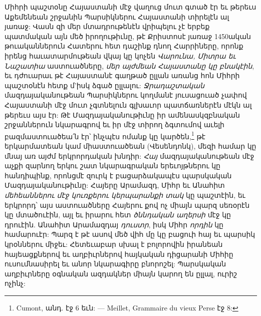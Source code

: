 \documentclass{article}
\begin{document}
{Միհրի պաշտօնը Հայաստանի մէջ վաղուց մուտ գտած էր եւ թերեւս Աքեմենեան շրջանին Պարսիկներու Հայաստանի տիրելէն ալ յառաջ: Վասն զի մեր մտադրութենէն վրիպելու չէ երբեք պատմական այն մեծ իրողութիւնը, թէ Քրիստոսէ յառաջ 1450ական թուականներուն Հատերու հետ դաշինք դնող Հարրիները, որոնք իրենց հաւատարմութեան վկայ կը կոչեն \emph{Վարունա, Միտրա եւ Նաշատիա} աստուածները, \emph{մեր այժմեան Հայաստանը կը բնակէին}, եւ դժուարաւ թէ Հայաստանէ գաղթած ըլլան առանց հոն Միհրի պաշտօնէն հետք մ'իսկ ձգած ըլլալու: \emph{Ջրադաշտական} մազդայականութեան Պարսիկներու կողմանէ յուսացուած չափով Հայաստանի մէջ մուտ չգտնելուն գլխաւոր պատճառներէն մէկն ալ թերեւս այս էր: Թէ Մազդայականութիւնը իր ամենասկզբնական շրջաններուն նկարագրով եւ իր մէջ տիրող ձգտումով աւելի բազմաստուածեա՛ն էր՝ ինչպէս ոմանք կը կարծեն,\footnote{Cumont, անդ. էջ 6 եւն: — Meillet, Grammaire du vieux Perse էջ 8:} թէ երկարմատեան կամ միաստուածեան (Վեսենդոնկ), մեզի համար կը մնայ առ այժմ երկրորդական խնդիր: \emph{Հայ} մազդայականութեան մէջ աչքի զարնող երկու շատ նկարագրական երեւոյթներու կը հանդիպինք, որոնցմէ զուրկ է բացարձակապէս պարսկական Մազդայականութիւնը: Հայերը Արամազդ, Միհր եւ Անահիտ \emph{մեհեաններու մէջ կուռքերու կերպարանքի տակ} կը պաշտէին, եւ երկրորդ՝ այս աստուածները Հայերու քով ոչ միայն պարզ սեռօրէն կը մտածուէին, այլ եւ իրարու հետ \emph{ծննդական աղերսի} մէջ կը դրուէին. Անահիտ Արամազդայ \emph{դուստր}, իսկ Միհր \emph{որդին} կը համարուէր: Պարզ է թէ ասով մեծ վիհ մը կը բացուի հայ եւ պարսիկ կրօններու միջեւ: Հետեւաբար սխալ է բոլորովին իրանեան հայեացքներով եւ աղբիւրներով հայկական դիցարանի Միհիը ուսումնասիրել եւ անոր նկարագիրը բնորոշել: Պարսկական աղբիւրները օգնական ազդակներ միայն կարող են ըլլալ, ուրիշ ոչինչ:

}
\end{document}
